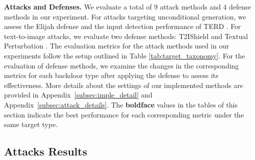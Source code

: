 \noindent \textbf{Attacks and Defenses. }
We evaluate a total of 9 attack methods and 4 defense methods in our experiment. For attacks targeting unconditional generation, we assess the Elijah defense \cite{an2024elijah} and the input detection performance of TERD \cite{pmlr-v235-mo24a}. For text-to-image attacks, we evaluate two defense methods: T2IShield \cite{wang2025t2ishield} and Textual Perturbation \cite{zhai2023text}. The evaluation metrics for the attack methods used in our experiments follow the setup outlined in Table \ref{tab:target_taxonomy}. 
For the evaluation of defense methods, we examine the changes in the corresponding metrics for each backdoor type after applying the defense to assess its effectiveness. More details about the settings of our implemented methods are provided in Appendix~\ref{subsec:imple_detail} and Appendix~\ref{subsec:attack_details}. 
The \textbf{boldface} values in the tables of this section indicate the best performance for each corresponding metric under the same target type.


\subsection{Attacks Results}\label{subsec:attacksresults}

